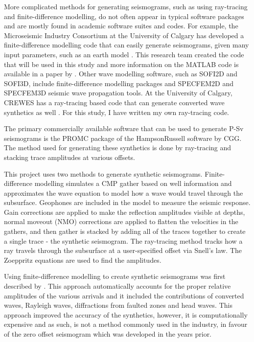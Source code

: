 \documentclass[12pt]{article}
\begin{document}
	More complicated methods for generating seismograms, such as using ray-tracing and finite-difference modelling, do not often appear in typical software packages and are mostly found in academic software suites and codes. For example, the Microseismic Industry Consortium at the University of Calgary has developed a finite-difference modelling code that can easily generate seismograms, given many input parameters, such as an earth model \citep{rodriguez2018f}. This research team created the code that will be used in this study and more information on the MATLAB code is available in a paper by \cite{boyd2006}. Other wave modelling software, such as SOFI2D and SOFI3D, include finite-difference modelling packages and SPECFEM2D and SPECFEM3D seismic wave propagation tools. At the University of Calgary, CREWES has a ray-tracing based code that can generate converted wave synthetics as well \citep{lawton1992}. For this study, I have written my own ray-tracing code.
	
	The primary commercially available software that can be used to generate P-Sv seismograms is the PROMC package of the HampsonRussell software by CGG. The method used for generating these synthetics is done by ray-tracing and stacking trace amplitudes at various offsets. 
	
	This project uses two methods to generate synthetic seismograms. Finite-difference modelling simulates a CMP gather based on well information and approximates the wave equation to model how a wave would travel through the subsurface. Geophones are included in the model to measure the seismic response. Gain corrections are applied to make the reflection amplitudes visible at depths, normal moveout (NMO) corrections are applied to flatten the velocities in the gathers, and then gather is stacked by adding all of the traces together to create a single trace - the synthetic seismogram. The ray-tracing method tracks how a ray travels through the subsurface at a user-specified offset via Snell's law. The Zoeppritz equations are used to find the amplitudes. 

	Using finite-difference modelling to create synthetic seismograms was first described by \cite{kelly1976}. This approach automatically accounts for the proper relative amplitudes of the various arrivals and it included the contributions of converted waves, Rayleigh waves, diffractions from faulted zones and head waves. This approach improved the accuracy of the synthetics, however, it is computationally expensive and as such, is not a method commonly used in the industry, in favour of the zero offset seismogram which was developed in the years prior.
	 
\end{document}
